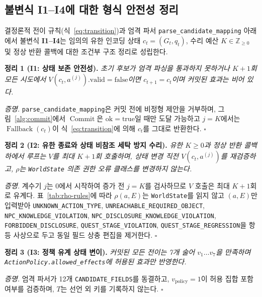 \subsection{불변식 I1--I4에 대한 형식 안전성 정리}\label{sec:formal-proofs}
결정론적 전이 규칙(식~\eqref{eq:transition})과 엄격 파서 \texttt{parse\_}\allowbreak\texttt{candidate\_}\allowbreak\texttt{mapping} 아래에서 불변식 \textbf{I1--I4}는 임의의 유한 인코딩 상태 $c_t=(G_t,q_t)$, 수리 예산 $K\in\mathbb{Z}_{\geq 0}$ 및 정상 반환 콜백에 대한 조건부 구조 정리로 성립한다.

\noindent\textbf{정리 1 (I1: 상태 보존 안전성).} \emph{초기 후보가 엄격 파싱을 통과하지 못하거나 $K{+}1$회 모든 시도에서 $V(c_t,a^{(j)}).\mathrm{valid}=\mathrm{false}$이면 $c_{t+1}=c_t$이며 커밋된 효과는 비어 있다.}
\par\noindent\textit{증명.} \texttt{parse\_}\allowbreak\texttt{candidate\_}\allowbreak\texttt{mapping}은 커밋 전에 비정형 제안을 거부하며, 그림~\ref{alg:commit}에서 $\operatorname{Commit}$은 $\mathrm{ok}=\mathrm{true}$일 때만 도달 가능하고 $j=K$에서는 $\operatorname{Fallback}(c_t)$이 식~\eqref{eq:transition}에 의해 $c_t$를 그대로 반환한다. \hfill$\square$

\noindent\textbf{정리 2 (I2: 유한 종료와 상태 비참조 세탁 방지 수리).} \emph{유한 $K{\geq}0$과 정상 반환 콜백 하에서 루프는 $V$를 최대 $K{+}1$회 호출하며, 상태 변경 직전 $V(c_t,a^{(j)})$를 재검증하고, $\rho$는 \texttt{WorldState} 의존 권한 오류 클래스를 변경하지 않는다.}
{\sloppy\par\noindent\textit{증명.} 계수기 $j$는 $0$에서 시작하여 증가 전 $j=K$를 검사하므로 $V$ 호출은 최대 $K{+}1$회로 유계다. 표~\ref{tab:rho-rules}에 따라 $\rho(a,E)$는 \texttt{WorldState}를 읽지 않고 $(a,E)$만 입력받아 \texttt{UNKNOWN\_}\allowbreak\texttt{ACTION\_}\allowbreak\texttt{TYPE}, \texttt{UNREACHABLE\_}\allowbreak\texttt{REQUIRED\_}\allowbreak\texttt{OBJECT}, \texttt{NPC\_}\allowbreak\texttt{KNOWLEDGE\_}\allowbreak\texttt{VIOLATION}, \texttt{NPC\_}\allowbreak\texttt{DIS\-CLOSURE\_}\allowbreak\texttt{KNOW\-LEDGE\_}\allowbreak\texttt{VIO\-LATION}, \texttt{FORBIDDEN\_}\allowbreak\texttt{DISCLOSURE}, \texttt{QUEST\_}\allowbreak\texttt{STAGE\_}\allowbreak\texttt{VIOLATION}, \texttt{QUEST\_}\allowbreak\texttt{STAGE\_}\allowbreak\texttt{REGRESSION}을 항등 사상으로 두고 동일 필드 상충 편집을 제거한다. \hfill$\square$\par}

\noindent\textbf{정리 3 (I3: 정책 유계 상태 변이).} \emph{커밋된 모든 전이는 7개 술어 $v_1\dots v_7$을 만족하며 \texttt{ActionPolicy.}\allowbreak\texttt{allowed\_}\allowbreak\texttt{effects}에 허용된 효과만 반영한다.}
\par\noindent\textit{증명.} 엄격 파서가 12개 \texttt{CANDIDATE\_}\allowbreak\texttt{FIELDS}를 동결하고, $v_{\mathrm{policy}}{=}1$이 허용 집합 포함 여부를 검증하며, $T$는 선언 외 키를 기록하지 않는다. \hfill$\square$

